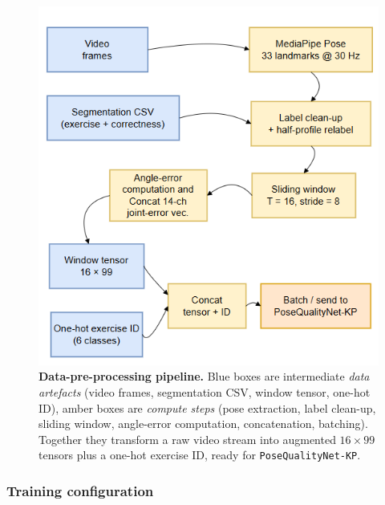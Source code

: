 \documentclass{article}
\begin{document}
\begin{figure}[H] 
  \centering
  \includegraphics[width=\linewidth]{figs/dataflow_pipeline}  %
   \caption{\textbf{Data-pre-processing pipeline.}
           Blue boxes are intermediate \emph{data artefacts}
           (video frames, segmentation CSV, window tensor, one-hot ID),
           amber boxes are \emph{compute steps}
           (pose extraction, label clean-up, sliding window, angle-error
           computation, concatenation, batching).
           Together they transform a raw video stream into augmented
           $16{\times}99$ tensors plus a one-hot exercise ID, ready for
           \texttt{PoseQualityNet-KP}.}
  \label{fig:dataflow}
\end{figure}



\subsubsection{Training configuration}
\label{sec:train}
\end{document}
